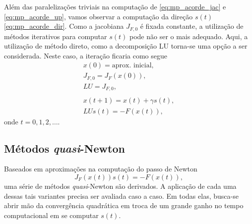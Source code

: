 Além das paralelizações triviais na computação de \eqref{eq:mp_acorde_jac} e \eqref{eq:mp_acorde_up}, vamos observar a computação da direção $s(t)$ \eqref{eq:mp_acorde_dir}. Como a jacobiana $J_{F,0}$ é fixada constante, a utilização de métodos iterativos para computar $s(t)$ pode não ser o mais adequado. Aqui, a utilização de método direto, como a decomposição LU torna-se uma opção a ser considerada. Neste caso, a iteração ficaria como segue
\begin{gather}
  x(0) = \text{aprox. inicial},\\
  J_{F,0} = J_F\left(x(0)\right),\\
  LU = J_{F,0},\\
  ~\nonumber\\
  x(t+1) = x(t) + \gamma s(t),\label{eq:mp_acorde_up}\\
  LUs(t) = -F(x(t)),\label{eq:mp_acorde_dir}
\end{gather}
onde $t=0, 1, 2, \ldots$.

\subsection{Métodos {\it quasi}-Newton}

Baseados em aproximações na computação do passo de Newton
\begin{equation}
  J_F\left(x(t)\right)s(t) = -F\left(x(t)\right),
\end{equation}
uma série de métodos {\it quasi}-Newton são derivados. A aplicação de cada uma dessas tais variantes precisa ser avaliada caso a caso. Em todas elas, busca-se abrir mão da convergência quadrática em troca de um grande ganho no tempo computacional em se computar $s(t)$.

